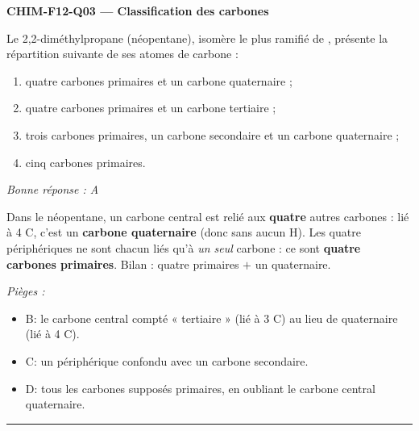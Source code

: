 \documentclass[11pt,a4paper]{article}
\begin{document}
\noindent\textbf{CHIM-F12-Q03 --- Classification des carbones}\par
Le 2,2-diméthylpropane (néopentane), isomère le plus ramifié de , présente la répartition suivante de ses atomes de carbone :
\begin{enumerate}[label=\Alph*)]
\item quatre carbones primaires et un carbone quaternaire ;
\item quatre carbones primaires et un carbone tertiaire ;
\item trois carbones primaires, un carbone secondaire et un carbone quaternaire ;
\item cinq carbones primaires.
\end{enumerate}
\textit{Bonne réponse : A}\par
Dans le néopentane, un carbone central est relié aux \textbf{quatre} autres carbones : lié à 4 C, c'est un \textbf{carbone quaternaire} (donc sans aucun H). Les quatre  périphériques ne sont chacun liés qu'à \emph{un seul} carbone : ce sont \textbf{quatre carbones primaires}. Bilan : quatre primaires $+$ un quaternaire.\par
\textit{Pièges :}
\begin{itemize}
\item B: le carbone central compté « tertiaire » (lié à 3 C) au lieu de quaternaire (lié à 4 C).
\item C: un  périphérique confondu avec un carbone secondaire.
\item D: tous les carbones supposés primaires, en oubliant le carbone central quaternaire.
\end{itemize}
\vspace{8pt}\hrule\vspace{8pt}
\end{document}
